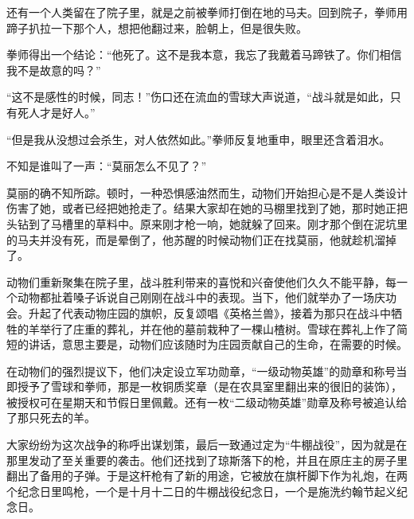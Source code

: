 还有一个人类留在了院子里，就是之前被拳师打倒在地的马夫。回到院子，拳师用蹄子扒拉一下那个人，想把他翻过来，脸朝上，但是很失败。

拳师得出一个结论：“他死了。这不是我本意，我忘了我戴着马蹄铁了。你们相信我不是故意的吗？”

“这不是感性的时候，同志！”伤口还在流血的雪球大声说道，“战斗就是如此，只有死人才是好人。”

“但是我从没想过会杀生，对人依然如此。”拳师反复地重申，眼里还含着泪水。

不知是谁叫了一声：“莫丽怎么不见了？”

莫丽的确不知所踪。顿时，一种恐惧感油然而生，动物们开始担心是不是人类设计伤害了她，或者已经把她抢走了。结果大家却在她的马棚里找到了她，那时她正把头钻到了马槽里的草料中。原来刚才枪一响，她就躲了回来。刚才那个倒在泥坑里的马夫并没有死，而是晕倒了，他苏醒的时候动物们正在找莫丽，他就趁机溜掉了。

动物们重新聚集在院子里，战斗胜利带来的喜悦和兴奋使他们久久不能平静，每一个动物都扯着嗓子诉说自己刚刚在战斗中的表现。当下，他们就举办了一场庆功会。升起了代表动物庄园的旗帜，反复颂唱《英格兰兽》，接着为那只在战斗中牺牲的羊举行了庄重的葬礼，并在他的墓前栽种了一棵山楂树。雪球在葬礼上作了简短的讲话，意思主要是，动物们应该随时为庄园贡献自己的生命，在需要的时候。

在动物们的强烈提议下，他们决定设立军功勋章，“一级动物英雄”的勋章和称号当即授予了雪球和拳师，那是一枚铜质奖章（是在农具室里翻出来的很旧的装饰），被授权可在星期天和节假日里佩戴。还有一枚“二级动物英雄”勋章及称号被追认给了那只死去的羊。

大家纷纷为这次战争的称呼出谋划策，最后一致通过定为“牛棚战役”，因为就是在那里发动了至关重要的袭击。他们还找到了琼斯落下的枪，并且在原庄主的房子里翻出了备用的子弹。于是这杆枪有了新的用途，它被放在旗杆脚下作为礼炮，在两个纪念日里鸣枪，一个是十月十二日的牛棚战役纪念日，一个是施洗约翰节起义纪念日。
